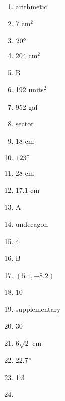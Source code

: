 \documentclass[../uilmath.tex]{subfiles}
\begin{document}
\begin{enumerate}[label=\bfseries\arabic*.]
    \item %
    arithmetic

    \item %
    7 cm$^2$

    \item %
    $20\degree$

    \item %
    204 cm$^2$

    \item %
    B 

    \item %
    192 units$^2$

    \item %
    952 gal 

    \item %
    sector 

    \item %
    18 cm

    \item %
    $123\degree$

    \item %
    28 cm 

    \item %
    17.1 cm 

    \item %
    A 

    \item %
    undecagon 

    \item %
    4

    \item %
    B 

    \item %
    $(5.1,-8.2)$

    \item %
    10

    \item %
    supplementary

    \item %
    30

    \item %
    $6\sqrt{2}$ cm 

    \item %
    22.7''

    \item %
    1:3

    \item %
    
\end{enumerate}
\end{document}

